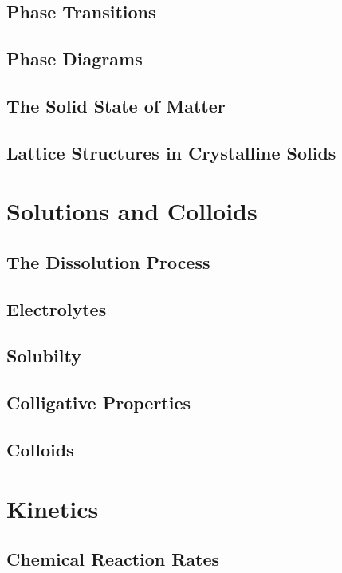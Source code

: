 \documentclass[12pt, openany, letterpaper]{memoir}
\begin{document}
\section{Phase Transitions}

\section{Phase Diagrams}

\section{The Solid State of Matter}

\section{Lattice Structures in Crystalline Solids}

\chapter{Solutions and Colloids}

\section{The Dissolution Process}

\section{Electrolytes}

\section{Solubilty}

\section{Colligative Properties}

\section{Colloids}

\chapter{Kinetics}

\section{Chemical Reaction Rates}
\end{document}
